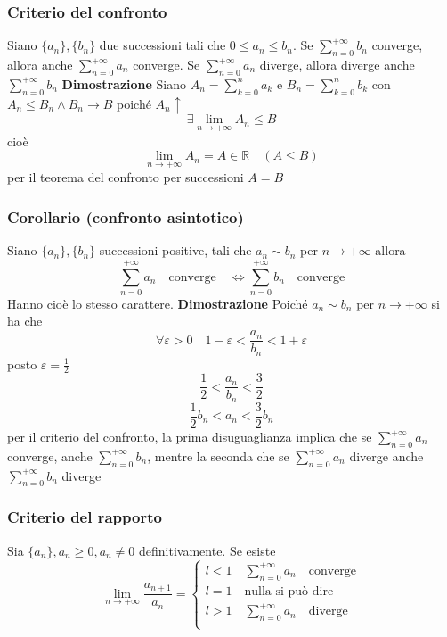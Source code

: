 \documentclass[12pt]{article}
\begin{document}
\subsubsection{Criterio del confronto}
Siano \(\{ a_n \}, \{ b_n \}\) due successioni tali che \(0 \leq a_n \leq b_n\). Se \(\displaystyle \sum_{n=0}^{+\infty} b_n\) converge, allora anche \(\displaystyle \sum_{n=0}^{+\infty} a_n\) converge. Se \(\displaystyle \sum_{n=0}^{+\infty} a_n\) diverge, allora diverge anche \(\displaystyle \sum_{n=0}^{+\infty} b_n\)
\textbf{Dimostrazione}\newline
Siano \(\displaystyle A_n = \sum_{k=0}^{n} a_k\) e \(\displaystyle B_n = \sum_{k=0}^{n} b_k\) con \( A_n \leq B_n \wedge B_n \to B\)
poiché \(A_n \uparrow\)
\[
\exists \lim_{n \to +\infty} A_n \leq B
\]
cioè
\[
\lim_{n \to + \infty} A_n = A \in \mathbb{R} \quad (A\leq B)
\]
per il teorema del confronto per successioni \(A=B\)

\subsubsection{Corollario (confronto asintotico)}
Siano \(\{ a_n \}, \{ b_n \}\) successioni positive, tali che \(a_n \sim b_n\)  per \(n \to +\infty\) allora
\[
\sum_{n=0}^{+\infty} a_n \quad \text{converge} \quad \Leftrightarrow \sum_{n=0}^{+\infty} b_n \quad \text{converge}
\]
Hanno cioè lo stesso carattere.
\newpage
\textbf{Dimostrazione}\newline
Poiché \(a_n \sim b_n\)  per \(n \to +\infty\) si ha che
\[
\forall \varepsilon > 0 \quad 1 - \varepsilon < \frac{a_n}{b_n} < 1 + \varepsilon
\]
posto \(\varepsilon = \frac{1}{2}\)
\[
\frac{1}{2} < \frac{a_n}{b_n} < \frac{3}{2}
\]
\[
\frac{1}{2}b_n < a_n< \frac{3}{2}b_n
\]
per il criterio del confronto, la prima disuguaglianza implica che se \(\displaystyle \sum_{n=0}^{+\infty} a_n\) converge, anche \(\displaystyle \sum_{n=0}^{+\infty} b_n\), mentre la seconda che se \(\displaystyle \sum_{n=0}^{+\infty} a_n\) diverge anche \(\displaystyle \sum_{n=0}^{+\infty} b_n\) diverge

\subsubsection{Criterio del rapporto}
Sia \(\{ a_n \}, a_n \geq 0, a_n \neq 0\) definitivamente. Se esiste
\[
\lim_{n \to +\infty} \frac{a_{n+1}}{a_n} = \begin{cases}
l<1 \quad \sum_{n=0}^{+\infty} a_n \quad \text{converge}\\
l=1 \quad \text{nulla si può dire}\\
l>1 \quad \sum_{n=0}^{+\infty} a_n \quad \text{diverge}\\
\end{cases}
\]
\end{document}
